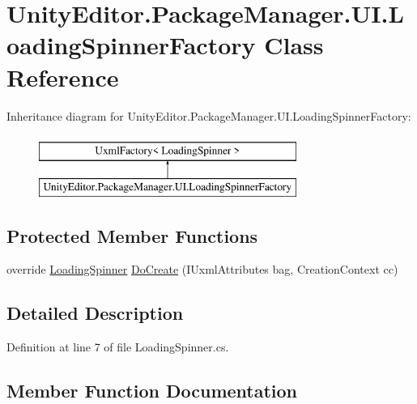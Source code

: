\hypertarget{class_unity_editor_1_1_package_manager_1_1_u_i_1_1_loading_spinner_factory}{}\section{Unity\+Editor.\+Package\+Manager.\+U\+I.\+Loading\+Spinner\+Factory Class Reference}
\label{class_unity_editor_1_1_package_manager_1_1_u_i_1_1_loading_spinner_factory}
Inheritance diagram for Unity\+Editor.\+Package\+Manager.\+U\+I.\+Loading\+Spinner\+Factory\+:\begin{figure}[H]
\begin{center}
\leavevmode
\includegraphics[height=2.000000cm]{class_unity_editor_1_1_package_manager_1_1_u_i_1_1_loading_spinner_factory}
\end{center}
\end{figure}
\subsection*{Protected Member Functions}
\begin{DoxyCompactItemize}
\item 
override \mbox{\hyperlink{class_unity_editor_1_1_package_manager_1_1_u_i_1_1_loading_spinner}{Loading\+Spinner}} \mbox{\hyperlink{class_unity_editor_1_1_package_manager_1_1_u_i_1_1_loading_spinner_factory_afe2cdaac2e641174e8e26877b0a2bcd0}{Do\+Create}} (I\+Uxml\+Attributes bag, Creation\+Context cc)
\end{DoxyCompactItemize}


\subsection{Detailed Description}


Definition at line 7 of file Loading\+Spinner.\+cs.



\subsection{Member Function Documentation}
\mbox{\label{class_unity_editor_1_1_package_manager_1_1_u_i_1_1_loading_spinner_factory_afe2cdaac2e641174e8e26877b0a2bcd0}} 
